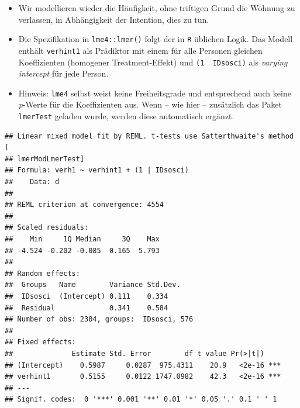 \documentclass[
]{book}
\newenvironment{Shaded}{\begin{snugshade}}{\end{snugshade}}
\newcommand{\DataTypeTok}[1]{\textcolor[rgb]{0.13,0.29,0.53}{#1}}
\newcommand{\DecValTok}[1]{\textcolor[rgb]{0.00,0.00,0.81}{#1}}
\newcommand{\KeywordTok}[1]{\textcolor[rgb]{0.13,0.29,0.53}{\textbf{#1}}}
\newcommand{\NormalTok}[1]{#1}
\newcommand{\OperatorTok}[1]{\textcolor[rgb]{0.81,0.36,0.00}{\textbf{#1}}}
\newcommand{\OtherTok}[1]{\textcolor[rgb]{0.56,0.35,0.01}{#1}}
\newcommand{\StringTok}[1]{\textcolor[rgb]{0.31,0.60,0.02}{#1}}
\begin{document}
\begin{itemize}
\item
  Wir modellieren wieder die Häufigkeit, ohne triftigen Grund die Wohnung zu verlassen, in Abhängigkeit der Intention, dies zu tun.
\item
  Die Spezifikation in \texttt{lme4::lmer()} folgt der in \texttt{R} üblichen Logik. Das Modell enthält \texttt{verhint1} als Prädiktor mit einem für alle Personen gleichen Koeffizienten (homogener Treatment-Effekt) und \texttt{(1\ \textbar{}~IDsosci)} als \emph{varying intercept} für jede Person.
\item
  Hinweis: \texttt{lme4} selbst weist keine Freiheitsgrade und entsprechend auch keine \emph{p}-Werte für die Koeffizienten aus. Wenn -- wie hier -- zusätzlich das Paket \texttt{lmerTest} geladen wurde, werden diese automatisch ergänzt.
\end{itemize}

\begin{Shaded}
\end{Shaded}

\begin{verbatim}
## Linear mixed model fit by REML. t-tests use Satterthwaite's method [
## lmerModLmerTest]
## Formula: verh1 ~ verhint1 + (1 | IDsosci)
##    Data: d
## 
## REML criterion at convergence: 4554
## 
## Scaled residuals: 
##    Min     1Q Median     3Q    Max 
## -4.524 -0.202 -0.085  0.165  5.793 
## 
## Random effects:
##  Groups   Name        Variance Std.Dev.
##  IDsosci  (Intercept) 0.111    0.334   
##  Residual             0.341    0.584   
## Number of obs: 2304, groups:  IDsosci, 576
## 
## Fixed effects:
##              Estimate Std. Error        df t value Pr(>|t|)    
## (Intercept)    0.5987     0.0287  975.4311    20.9   <2e-16 ***
## verhint1       0.5155     0.0122 1747.0982    42.3   <2e-16 ***
## ---
## Signif. codes:  0 '***' 0.001 '**' 0.01 '*' 0.05 '.' 0.1 ' ' 1
\end{verbatim}
\end{document}
